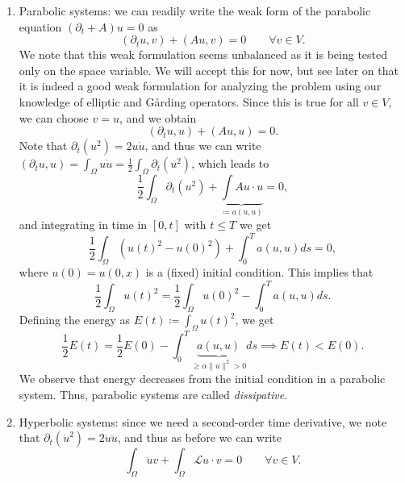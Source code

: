\begin{enumerate}
    \item Parabolic systems: we can readily write the weak form of the parabolic equation $(\partial_t + A)u=0$ as
    \begin{equation}
        (\partial_t u, v) + (Au, v) = 0 \qquad \forall v\in V.
    \end{equation}
    We note that this weak formulation seems unbalanced as it is being tested only on the space variable. We will accept this for now, but see later on that it is indeed a good weak formulation for analyzing the problem using our knowledge of elliptic and Gårding operators. Since this is true for all $v\in V$, we can choose $v=u$, and we obtain
    \begin{equation*}
        (\partial_t u, u) + (Au,u) = 0.
    \end{equation*}
    Note that $\partial_t(u^2) = 2u\dot{u}$, and thus we can write $(\partial_t u, u) = \int_\Omega u\dot{u} = \frac{1}{2}\int_\Omega \partial_t (u^2)$, which leads to
    \begin{equation*}
        \frac{1}{2}\int_\Omega \partial_t (u^2) + \underbrace{\int Au \cdot u}_{ \coloneqq  a(u,u)} = 0, 
    \end{equation*}
    and integrating in time in $[0,t]$ with $t\leq T$ we get
    \begin{equation*}
        \frac{1}{2} \int_\Omega (u(t)^2-u(0)^2)  + \int_0^T a(u,u)ds = 0,
    \end{equation*}
    where $u(0) = u(0,x)$ is a (fixed) initial condition. This implies that
    \begin{equation*}
        \frac{1}{2}\int_\Omega u(t)^2 =  \frac{1}{2} \int_\Omega u(0)^2 - \int_0^T a(u,u)ds.
    \end{equation*}
    Defining the energy as $E(t) \coloneqq \int_\Omega u(t)^2$, we get
    \begin{equation}
        \frac{1}{2}E(t) = \frac{1}{2}E(0) - \int_0^T \underbrace{a(u,u)}_{\geq \alpha\|u\|^2>0} ds \implies \boxed{E(t) < E(0)}.
    \end{equation}
    We observe that energy decreases from the initial condition in a parabolic system. Thus, parabolic systems are called \emph{dissipative}.
    \item Hyperbolic systems: since we need a second-order time derivative, we note that $\partial_t(\dot{u}^2) = 2\dot{u}\ddot{u}$, and thus as before we can write
    \begin{equation}
        \int_\Omega \ddot{u}v + \int_\Omega \mathcal{L}u\cdot v = 0 \qquad \forall v\in V.

\end{equation}
\end{enumerate}
